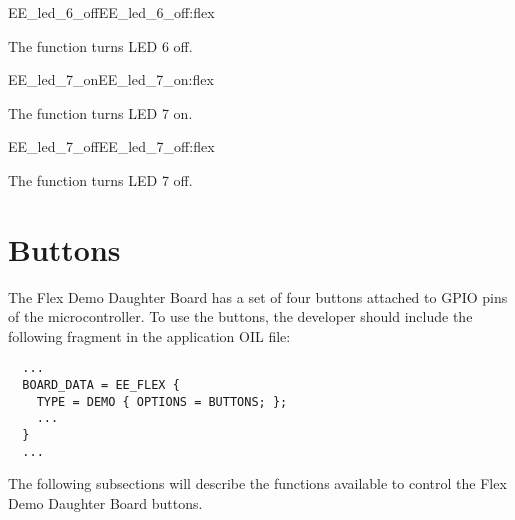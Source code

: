 \begin{function_nopb2}{EE\_led\_6\_off}{EE_led_6_off:flex}
  
  \begin{fundescription}
    The function turns LED 6 off.
  \end{fundescription}
\end{function_nopb2}

\begin{function_nopb2}{EE\_led\_7\_on}{EE_led_7_on:flex}
  
  \begin{fundescription}
    The function turns LED 7 on.
  \end{fundescription}
\end{function_nopb2}

\begin{function_nopb2}{EE\_led\_7\_off}{EE_led_7_off:flex}
  
  \begin{fundescription}
    The function turns LED 7 off.
  \end{fundescription}
\end{function_nopb2}





\section{Buttons}

The Flex Demo Daughter Board has a set of four buttons attached to GPIO pins
of the microcontroller. To use the buttons, the developer should
include the following fragment in the application OIL file:

\begin{lstlisting}
  ...
  BOARD_DATA = EE_FLEX {
    TYPE = DEMO { OPTIONS = BUTTONS; };
    ...
  }
  ...
\end{lstlisting}

The following subsections will describe the functions available to
control the Flex Demo Daughter Board buttons.


